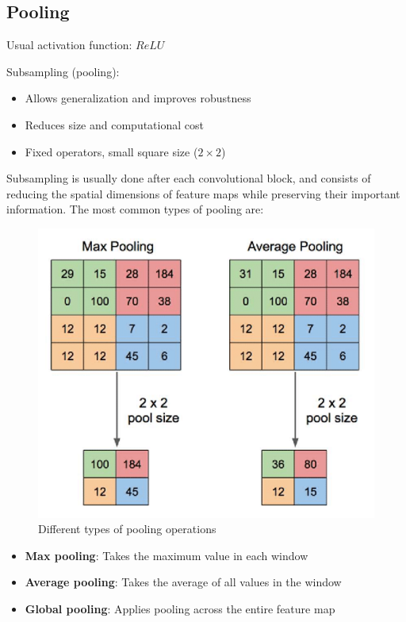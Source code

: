 \subsection{Pooling}

Usual activation function: $ReLU$

Subsampling (pooling):
\begin{itemize}
	\item Allows generalization and improves robustness
	\item Reduces size and computational cost
	\item Fixed operators, small square size ($2\times 2$)
\end{itemize}

Subsampling is usually done after each convolutional block, and consists of reducing the spatial dimensions of feature maps while preserving their important information. The most common types of pooling are:

\begin{figure}[htbp]
   \centering
   \includegraphics{images/10/pooling.png}
   \caption{Different types of pooling operations}
   \label{fig:10/pooling}
\end{figure}

\begin{itemize}
   \item \textbf{Max pooling}: Takes the maximum value in each window
   \item \textbf{Average pooling}: Takes the average of all values in the window
   \item \textbf{Global pooling}: Applies pooling across the entire feature map
\end{itemize}

